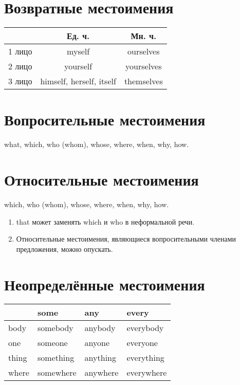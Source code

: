\documentclass[oneside]{book}
\begin{document}
    \section{Возвратные местоимения}
    \begin{center}
        \begin{tabular}{|c|c|c|}
            \hline

            & Ед. ч. & Мн. ч.
            \\
            \hline

            1 лицо & myself & ourselves
            \\
            \hline

            2 лицо & yourself & yourselves
            \\
            \hline

            3 лицо & himself, herself, itself & themselves
            \\
            \hline
        \end{tabular}
    \end{center}

    \section{Вопросительные местоимения}
    what, which, who (whom), whose,
    where, when, why, how.

    \section{Относительные местоимения}
    which, who (whom), whose,
    where, when, why, how.

    \begin{enumerate}
        \item that может заменять which и who
        в неформальной речи.

        \item Относительные местоимения,
        являющиеся вопросительными членами
        предложения, можно опускать.
    \end{enumerate}

    \section{Неопределённые местоимения}
    \begin{center}
        \begin{tabular}{|l|l|l|l|}
        \hline
              & some      & any      & every      \\ \hline
        body  & somebody  & anybody  & everybody  \\ \hline
        one   & someone   & anyone   & everyone   \\ \hline
        thing & something & anything & everything \\ \hline
        where & somewhere & anywhere & everywhere \\ \hline
        \end{tabular}
    \end{center}
\end{document}
